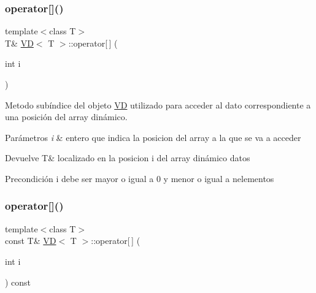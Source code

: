 \subsubsection{\texorpdfstring{operator[]()}{operator[]()}\hspace{0.1cm}{\footnotesize\ttfamily [1/2]}}
{\footnotesize\ttfamily template$<$class T$>$ \\
T\& \hyperlink{classVD}{VD}$<$ T $>$\+::operator\mbox{[}$\,$\mbox{]} (\begin{DoxyParamCaption}\item[{int}]{i }\end{DoxyParamCaption})\hspace{0.3cm}{\ttfamily [inline]}}



Metodo subíndice del objeto \hyperlink{classVD}{VD} utilizado para acceder al dato correspondiente a una posición del array dinámico. 


\begin{DoxyParams}{Parámetros}
{\em i} & entero que indica la posicion del array a la que se va a acceder \\
\hline
\end{DoxyParams}
\begin{DoxyReturn}{Devuelve}
T\& localizado en la posicion i del array dinámico datos 
\end{DoxyReturn}
\begin{DoxyPrecond}{Precondición}
i debe ser mayor o igual a 0 y menor o igual a nelementos 
\end{DoxyPrecond}
\mbox{\label{classVD_a16ae24a4b545a02baf6733ba5c066346}} 
\subsubsection{\texorpdfstring{operator[]()}{operator[]()}\hspace{0.1cm}{\footnotesize\ttfamily [2/2]}}
{\footnotesize\ttfamily template$<$class T$>$ \\
const T\& \hyperlink{classVD}{VD}$<$ T $>$\+::operator\mbox{[}$\,$\mbox{]} (\begin{DoxyParamCaption}\item[{int}]{i }\end{DoxyParamCaption}) const\hspace{0.3cm}{\ttfamily [inline]}}



